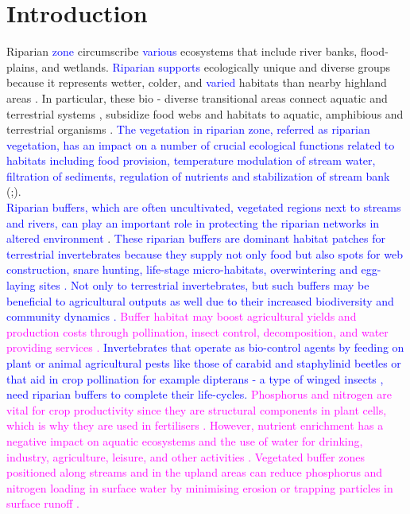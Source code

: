 \documentclass[12pt]{article}
\numberwithin{equation}{section}
\begin{document}
\section{Introduction}
Riparian \textcolor{blue} {zone} circumscribe \textcolor{blue}{various} ecosystems that include river banks, flood-plains, and wetlands. \textcolor{blue}{Riparian supports} ecologically unique and diverse groups because it represents wetter, colder, and \textcolor{blue}{varied} habitats than nearby highland areas \cite{pettit2007fire}. In particular, these bio - diverse transitional areas connect aquatic and terrestrial systems \cite{popescu2021riparian}, subsidize food webs and habitats to aquatic, amphibious and terrestrial organisms \cite{capron2020}. \textcolor{blue}{The vegetation in riparian zone, referred as riparian vegetation, has an impact on a number of crucial ecological functions related to habitats including food provision, temperature modulation of stream water, filtration of sediments, regulation of nutrients and stabilization of stream bank} (\cite{hood2000};\cite{richardson2007}).\\
\textcolor{blue}{Riparian buffers, which are often uncultivated, vegetated regions next to streams and rivers, can play an important role in protecting the riparian networks in altered environment \cite{burdon2020assessing}}. \textcolor{blue}{These riparian buffers are dominant habitat patches for terrestrial invertebrates because they supply not only food but also spots for web construction, snare hunting, life-stage micro-habitats, overwintering and egg-laying sites \cite{popescu2021riparian}. Not only to terrestrial invertebrates, but such buffers may be beneficial to agricultural outputs as well due to their increased biodiversity and community dynamics \cite{forio2020small}.} \textcolor{magenta}{Buffer habitat may boost agricultural yields and production costs through pollination, insect control, decomposition, and water providing services \cite{luke2019}.} \textcolor{blue}{Invertebrates that operate as bio-control agents by feeding on plant or animal agricultural pests like those of carabid and staphylinid beetles \cite{andersen2000long} or that aid in crop pollination for example dipterans - a type of winged insects \cite{ssymank2008pollinating}, need riparian buffers to complete their life-cycles.} \textcolor{magenta}{Phosphorus and nitrogen are vital for crop productivity since they are structural components in plant cells, which is why they are used in fertilisers \cite{sharma2017}. However, nutrient enrichment has a negative impact on aquatic ecosystems and the use of water for drinking, industry, agriculture, leisure, and other activities \cite{carpenter1998}. Vegetated buffer zones positioned along streams and in the upland areas can reduce phosphorus and nitrogen loading in surface water by minimising erosion or trapping particles in surface runoff \cite{vought1995}.} \\
\end{document}
